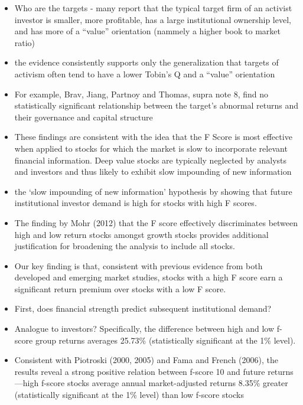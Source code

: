 \documentclass[12pt]{article}
\begin{document}
    \begin{itemize}
        \item Who are the targets - many report that the typical target firm of an activist investor is smaller, more profitable, has a large institutional ownership level, and has more of a “value” orientation (nammely a higher book to market ratio) \citet{CoffeeJr.2014}
        \item the evidence consistently supports only the generalization that targets of activism often tend to have a lower Tobin’s Q and a “value” orientation \citet{CoffeeJr.2014}
        \item For example, Brav, Jiang, Partnoy and Thomas, supra note 8, find no statistically significant relationship between the target’s abnormal returns and their governance and capital structure \citet{CoffeeJr.2014}
        \item These findings are consistent with the idea that the F Score is most effective when applied to stocks for which the market is slow to incorporate relevant financial information. Deep value stocks are typically neglected by analysts and investors and thus likely to exhibit slow impounding of new information \citet{Hyde2014}
        \item the ‘slow impounding of new information’ hypothesis by showing that future institutional investor demand is high for stocks with high F scores. \citet{Hyde2014}
        \item The finding by Mohr (2012) that the F score effectively discriminates between high and low return stocks amongst growth stocks provides additional justification for broadening the analysis to include all stocks. \citet{Hyde2014}
        \item Our key finding is that, consistent with previous evidence from both developed and emerging market studies, stocks with a high F score earn a significant return premium over stocks with a low F score.\citet{Hyde2014}
        \item First, does financial strength predict subsequent institutional demand? \citet{Choi2012}
        \item Analogue to investors? Specifically, the difference between high and low f-score group returns averages 25.73\% (statistically significant at the 1\% level). \citet{Choi2012}
        \item Consistent with Piotroski (2000, 2005) and Fama and French (2006), the results reveal a strong positive relation between f-score 10 and future returns—high f-score stocks average annual market-adjusted returns 8.35\% greater (statistically significant at the 1\% level) than low f-score stocks \citet{Choi2012} 

    \end{itemize}
\end{document}
